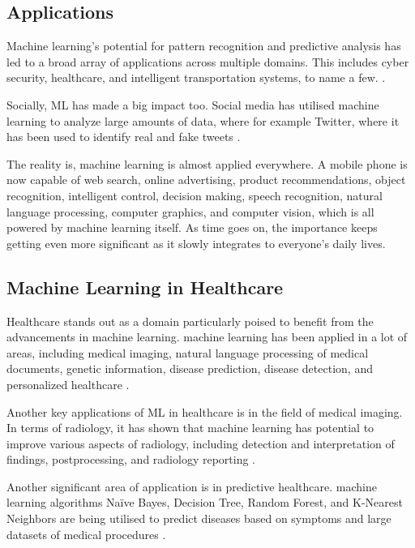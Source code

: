 \newpage
\subsection{Applications}
Machine learning's potential for pattern recognition and predictive analysis has led to a broad array of applications across multiple domains. This includes cyber security, healthcare, and intelligent transportation systems, to name a few. \parencite{Jhaveri2022}.

Socially, ML has made a big impact too. Social media has utilised machine learning to analyze large amounts of data, where for example Twitter, where it has been used to identify real and fake tweets \parencite{Arora2018}.

The reality is, machine learning is almost applied everywhere. A mobile phone is now capable of web search, online advertising, product recommendations, object recognition, intelligent control, decision making, speech recognition, natural language processing, computer graphics, and computer vision, which is all powered by machine learning itself. As time goes on, the importance keeps getting even more significant as it slowly integrates to everyone's daily lives.\\

\newpage
\subsection{Machine Learning in Healthcare}
Healthcare stands out as a domain particularly poised to benefit from the advancements in machine learning. machine learning has been applied in a lot of areas, including medical imaging, natural language processing of medical documents, genetic information, disease prediction, disease detection, and personalized healthcare \parencite{Mana2022}.

Another key applications of ML in healthcare is in the field of medical imaging. In terms of radiology, it has shown that machine learning has potential to improve various aspects of radiology, including detection and interpretation of findings, postprocessing, and radiology reporting \parencite{Choy2018, Erickson2017}.

Another significant area of application is in predictive healthcare. machine learning algorithms Naïve Bayes, Decision Tree, Random Forest, and K-Nearest Neighbors are being utilised to predict diseases based on symptoms and large datasets of medical procedures \parencite{Garg2023}.\\

